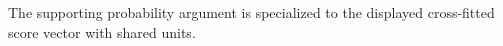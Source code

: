 The supporting probability argument is specialized to the displayed cross-fitted score vector with shared units.